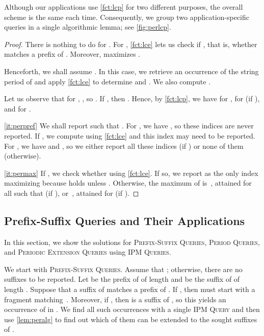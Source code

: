 \documentclass[a4paper]{article}
\theoremstyle{definition}
\theoremstyle{remark}
\newcommand{\IPM}{\textsc{IPM Queries}\xspace}
\newcommand{\PQ}{\textsc{Period Queries}\xspace}
\newcommand{\BQ}{\textsc{Prefix-Suffix Queries}\xspace}
\newcommand{\PEQ}{\textsc{Periodic Extension Queries}\xspace}
\begin{document}
Although our applications use \cref{fct:lcp} for two different purposes,
the overall scheme is the same each time. Consequently, we group two application-specific queries
in a single algorithmic lemma; see \cref{fig:perlcp}.

\peralg*
\begin{proof}
There is nothing to do for .
For , \cref{fct:lce} lets us check if , that is, whether  matches a prefix of .
Moreover,  maximizes .

Henceforth, we shall assume . In this case, we retrieve an occurrence  of the string period  of  and apply \cref{fct:lce} to determine  and .
We also compute .

Let us observe that for , , so .
If , then .
Hence, by \cref{fct:lcp}, we have  for ,
 for  (if ),
and  for .

\ref{it:perpref}
We shall report  such that .
For , we have , so these indices are never reported.
If , we compute  using \cref{fct:lce} and this index may need to be reported.
For , we have  and , so we either report all these indices (if ) or none of them (otherwise).

\ref{it:permax}
If , we check whether  using \cref{fct:lce}.
If so, we report  as the only index maximizing  because  holds unless .
Otherwise, the maximum of  is~, attained for all  such that  (if ),
or~, attained for  (if ).
\end{proof}


\subsection{Prefix-Suffix Queries and Their Applications}\label{sec:BQ}
In this section, we show the solutions for \BQ, \PQ, and \PEQ using \IPM.

We start with \BQ. Assume that ; otherwise, there are no suffixes to be reported.
Let  be the prefix of  of length  and  be the suffix of  of length .
Suppose that a suffix  of  matches a prefix of . If , then  must start with a fragment matching~.
Moreover, if , then  is a suffix of , so this yields an occurrence of  in .
We find all such occurrences with a single \textsc{IPM Query} and then use \cref{lem:peralg} to find out which of them
can be extended to the sought suffixes  of .
\end{document}
